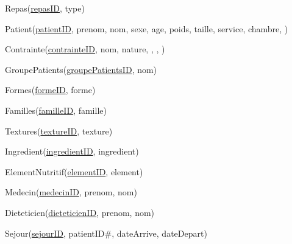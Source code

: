 
Repas(\underline{repasID}, type)

Patient(\underline{patientID}, prenom, nom, sexe, age, poids, taille, service, chambre, )

Contrainte(\underline{contrainteID}, nom, nature, , , )


GroupePatients(\underline{groupePatientsID}, nom)

Formes(\underline{formeID}, forme)

Familles(\underline{familleID}, famille)

Textures(\underline{textureID}, texture)

Ingredient(\underline{ingredientID}, ingredient)



ElementNutritif(\underline{elementID}, element)



Medecin(\underline{medecinID}, prenom, nom)

Dieteticien(\underline{dieteticienID}, prenom, nom)


Sejour(\underline{sejourID}, patientID\#, dateArrive, dateDepart)

